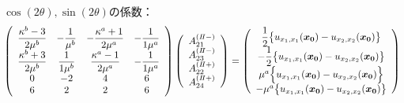 $\cos(2\theta),\sin(2\theta)$の係数：
\begin{align}
	\left(
	\begin{array}{cccc}
		{\displaystyle\frac{ \kappa^b-3}{2\mu^{b}}}& {\displaystyle-\frac{1}{\mu^{b}}} &
		{\displaystyle-\frac{\kappa^a+1}{2\mu^{a}}} & {\displaystyle-\frac{1}{1\mu^{a}}} \\
		{\displaystyle\frac{\kappa^b+3}{2\mu^{b}}} & {\displaystyle\frac{1}{1\mu^{b}}} &
		{\displaystyle\frac{\kappa^a-1}{2\mu^{a}}} & {\displaystyle-\frac{1}{1\mu^{a}}} \\
		0 & -2 & 4 & 6 \\
		6 & 2 & 2 & 6\\
	\end{array}
	\right)
	\left(
	\begin{array}{c}
		A_{21}^{(I\hspace{-.15em}I-)} \\
	 	A_{23}^{(I\hspace{-.15em}I-)} \\
		A_{22}^{(I\hspace{-.15em}I+)}\\
	 	A_{24}^{(I\hspace{-.15em}I+)} \\
	\end{array}
	\right)
	=
	\left(
	\begin{array}{c}
		{\displaystyle\frac{1}{2}\bigl\{u_{x_{1},x_{1}}(\bm{x_{0}})-u_{x_{2},x_{2}}(\bm{x_{0}})\bigr\}} \\
	 	{\displaystyle-\frac{1}{2}\bigl\{u_{x_{1},x_{1}}(\bm{x_{0}})-u_{x_{2},x_{2}}(\bm{x_{0}})\bigr\}} \\
		\mu^a\Bigl\{ u_{x_{1},x_{1}}(\bm{x_{0}})- u_{x_{2},x_{2}}(\bm{x_{0}})\Bigr\} \\
	 	-\mu^a \bigl\{u_{x_{1},x_{1}}(\bm{x_{0}})-u_{x_{2},x_{2}}(\bm{x_{0}})\bigr\} \\
	\end{array}
	\right)
\end{align}
